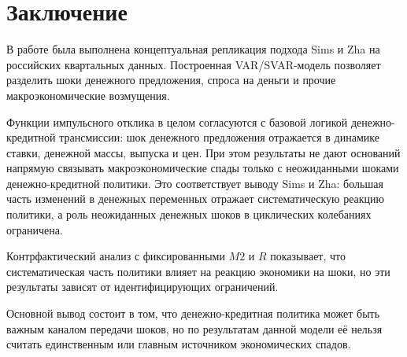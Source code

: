 \section{Заключение}

В работе была выполнена концептуальная репликация подхода Sims и Zha на российских квартальных данных. Построенная VAR/SVAR-модель позволяет разделить шоки денежного предложения, спроса на деньги и прочие макроэкономические возмущения.

Функции импульсного отклика в целом согласуются с базовой логикой денежно-кредитной трансмиссии: шок денежного предложения отражается в динамике ставки, денежной массы, выпуска и цен. При этом результаты не дают оснований напрямую связывать макроэкономические спады только с неожиданными шоками денежно-кредитной политики. Это соответствует выводу Sims и Zha: большая часть изменений в денежных переменных отражает систематическую реакцию политики, а роль неожиданных денежных шоков в циклических колебаниях ограничена.

Контрфактический анализ с фиксированными $M2$ и $R$ показывает, что систематическая часть политики влияет на реакцию экономики на шоки, но эти результаты зависят от идентифицирующих ограничений.

Основной вывод состоит в том, что денежно-кредитная политика может быть важным каналом передачи шоков, но по результатам данной модели её нельзя считать единственным или главным источником экономических спадов.
